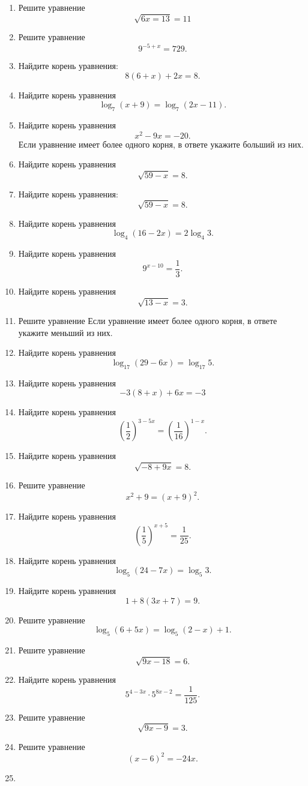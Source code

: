 \begin{enumerate}
\item
  Решите уравнение \[\sqrt{6x=13}=11\]
\item
  Решите уравнение \[9^{-5 + x} = 729.\]
\item
  Найдите корень уравнения: \[8(6 + x) + 2x = 8.\]
\item
  Найдите корень уравнения \[\log_{7}(x + 9) = \log_{7}(2x - 11).\]
\item
  Найдите корень уравнения \[x^2 - 9x = -20.\] Если уравнение имеет
  более одного корня, в ответе укажите больший из них.
\item
  Найдите корень уравнения \[\sqrt{59 - x} = 8.\]
\item
  Найдите корень уравнения: \[\sqrt{59 - x} = 8.\]
\item
  Найдите корень уравнения \[\log_{4}(16 - 2x) = 2\log_{4}3.\]
\item
  Найдите корень уравнения \[9^{x - 10} = \frac{1}{3}.\]
\item
  Найдите корень уравнения \[\sqrt{13 - x} = 3.\]
\item
  Решите уравнение Если уравнение имеет более одного корня, в ответе
  укажите меньший из них.
\item
  Найдите корень уравнения \[\log_{17}(29 - 6x) = \log_{17}5.\]
\item
  Найдите корень уравнения \[-3(8 + x) + 6x = -3\]
\item
  Найдите корень уравнения
  \[\left(\frac{1}{2}\right)^{3 - 5x} = \left(\frac{1}{16}\right)^{1 - x}.\]
\item
  Найдите корень уравнения \[\sqrt{-8 + 9x} = 8.\]
\item
  Решите уравнение \[x^2 + 9 = (x + 9)^2.\]
\item
  Найдите корень уравнения
  \[\left(\frac{1}{5}\right)^{x + 5} = \frac{1}{25}.\]
\item
  Найдите корень уравнения \[\log_{5}(24 - 7x) = \log_{5}3.\]
\item
  Найдите корень уравнения \[1 + 8(3x + 7) = 9.\]
\item
  Решите уравнение \[\log_{5}(6 + 5x) = \log_{5}(2 - x) + 1.\]
\item
  Решите уравнение \[\sqrt{9x - 18} = 6.\]
\item
  Найдите корень уравнения
  \[5^{4 - 3x} \cdot 5^{8x - 2} = \frac{1}{125}.\]
\item
  Решите уравнение \[\sqrt{9x - 9} = 3.\]
\item
  Решите уравнение \[(x - 6)^2 = -24x.\]
\item

\end{enumerate}
